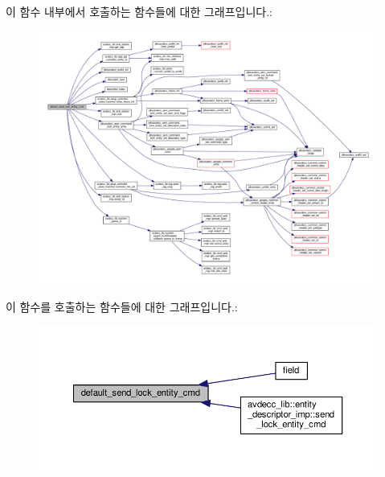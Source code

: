 이 함수 내부에서 호출하는 함수들에 대한 그래프입니다.\+:
\nopagebreak
\begin{figure}[H]
\begin{center}
\leavevmode
\includegraphics[width=350pt]{classavdecc__lib_1_1descriptor__base__imp_af40ac09b84feb7551bf0389a2a5db4ca_cgraph}
\end{center}
\end{figure}




이 함수를 호출하는 함수들에 대한 그래프입니다.\+:
\nopagebreak
\begin{figure}[H]
\begin{center}
\leavevmode
\includegraphics[width=350pt]{classavdecc__lib_1_1descriptor__base__imp_af40ac09b84feb7551bf0389a2a5db4ca_icgraph}
\end{center}
\end{figure}


